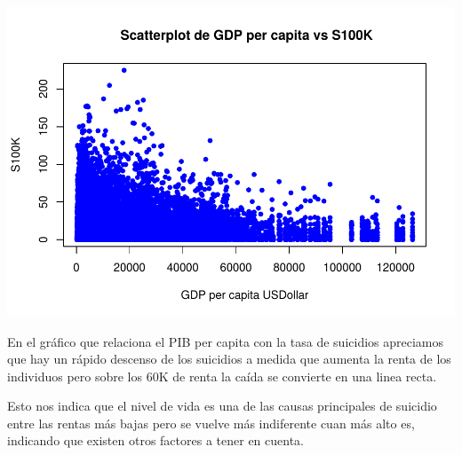 \documentclass[]{article}
\newenvironment{Shaded}{\begin{snugshade}}{\end{snugshade}}
\newcommand{\CommentTok}[1]{\textcolor[rgb]{0.56,0.35,0.01}{\textit{#1}}}
\newcommand{\DataTypeTok}[1]{\textcolor[rgb]{0.13,0.29,0.53}{#1}}
\newcommand{\DecValTok}[1]{\textcolor[rgb]{0.00,0.00,0.81}{#1}}
\newcommand{\KeywordTok}[1]{\textcolor[rgb]{0.13,0.29,0.53}{\textbf{#1}}}
\newcommand{\NormalTok}[1]{#1}
\newcommand{\OperatorTok}[1]{\textcolor[rgb]{0.81,0.36,0.00}{\textbf{#1}}}
\newcommand{\StringTok}[1]{\textcolor[rgb]{0.31,0.60,0.02}{#1}}
\begin{document}
\begin{Shaded}
\end{Shaded}

\includegraphics{Informe_files/figure-latex/unnamed-chunk-21-1.pdf}

En el gráfico que relaciona el PIB per capita con la tasa de suicidios
apreciamos que hay un rápido descenso de los suicidios a medida que
aumenta la renta de los individuos pero sobre los 60K de renta la caída
se convierte en una linea recta.

Esto nos indica que el nivel de vida es una de las causas principales de
suicidio entre las rentas más bajas pero se vuelve más indiferente cuan
más alto es, indicando que existen otros factores a tener en cuenta.

\begin{Shaded}
\end{Shaded}
\end{document}

